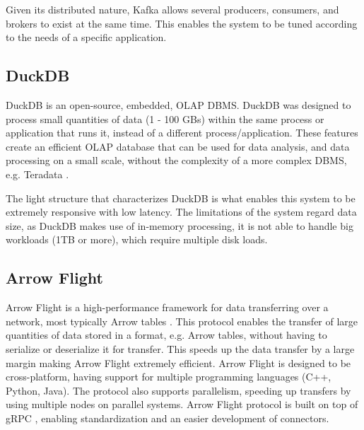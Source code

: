 Given its distributed nature, Kafka allows several producers, consumers, and brokers to exist at the same time. This enables the system to be tuned according to the needs of a specific application. 

\subsection{DuckDB}

DuckDB \cite{raasveldtDuckDBEmbeddableAnalytical2019} is an open-source, embedded, \gls{OLAP} \gls{DBMS}. DuckDB was designed to process small quantities of data (1 - 100 GBs) within the same process or application that runs it, instead of a different process/application. These features create an efficient \gls{OLAP} database that can be used for data analysis, and data processing on a small scale, without the complexity of a more complex \gls{DBMS}, e.g. Teradata \cite{shahImproveYourOLAP}. 

The light structure that characterizes DuckDB is what enables this system to be extremely responsive with low latency. The limitations of the system regard data size, as DuckDB makes use of in-memory processing, it is not able to handle big workloads (1TB or more), which require multiple disk loads.

\subsection{Arrow Flight}

Arrow Flight is a high-performance framework for data transferring over a network, most typically Arrow tables \cite{wesmIntroducingApacheArrow2019}. This protocol enables the transfer of large quantities of data stored in a format, e.g. Arrow tables, without having to serialize or deserialize it for transfer. This speeds up the data transfer by a large margin making Arrow Flight extremely efficient. Arrow Flight is designed to be cross-platform, having support for multiple programming languages (C++, Python, Java). The protocol also supports parallelism, speeding up transfers by using multiple nodes on parallel systems. Arrow Flight protocol is built on top of gRPC \cite{GRPC}, enabling standardization and an easier development of connectors. 